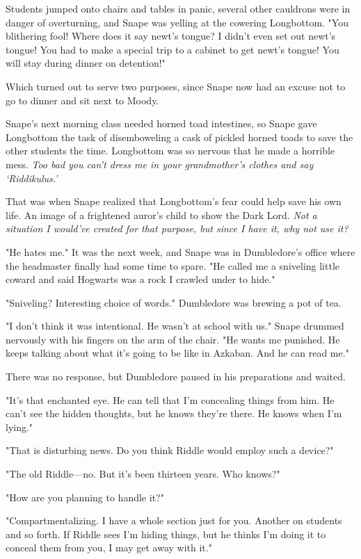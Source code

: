 Students jumped onto chairs and tables in panic, several other cauldrons were in danger of overturning, and Snape was yelling at the cowering Longbottom. "You blithering fool! Where does it say newt's tongue? I didn't even set out newt's tongue! You had to make a special trip to a cabinet to get newt's tongue! You will stay during dinner on detention!"

Which turned out to serve two purposes, since Snape now had an excuse not to go to dinner and sit next to Moody.

Snape's next morning class needed horned toad intestines, so Snape gave Longbottom the task of disemboweling a cask of pickled horned toads to save the other students the time. Longbottom was so nervous that he made a horrible mess. \emph{Too bad you can't dress me in your grandmother's clothes and say `Riddikulus.'}

That was when Snape realized that Longbottom's fear could help save his own life. An image of a frightened auror's child to show the Dark Lord. \emph{Not a situation I would've created for that purpose, but since I have it, why not use it?}

"He hates me." It was the next week, and Snape was in Dumbledore's office where the headmaster finally had some time to spare. "He called me a sniveling little coward and said Hogwarts was a rock I crawled under to hide."

"Sniveling? Interesting choice of words." Dumbledore was brewing a pot of tea.

"I don't think it was intentional. He wasn't at school with us." Snape drummed nervously with his fingers on the arm of the chair. "He wants me punished. He keeps talking about what it's going to be like in Azkaban. And he can read me."

There was no response, but Dumbledore paused in his preparations and waited.

"It's that enchanted eye. He can tell that I'm concealing things from him. He can't see the hidden thoughts, but he knows they're there. He knows when I'm lying."

"That is disturbing news. Do you think Riddle would employ such a device?"

"The old Riddle—no. But it's been thirteen years. Who knows?"

"How are you planning to handle it?"

"Compartmentalizing. I have a whole section just for you. Another on students and so forth. If Riddle sees I'm hiding things, but he thinks I'm doing it to conceal them from you, I may get away with it."

